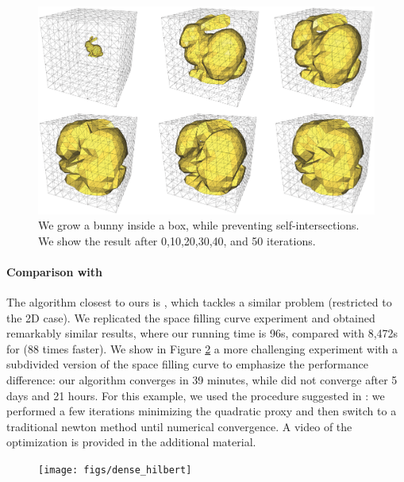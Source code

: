 \begin{figure}[t]
\includegraphics[width=0.8\columnwidth]{figs/rabbit_grow}
\caption{We grow a bunny inside a box, while preventing  self-intersections. We show the result after 0,10,20,30,40, and 50 iterations.}
\label{scaf:fig:rabbit}
\end{figure}


\paragraph{Comparison with \cite{Smith:2015}}
The algorithm closest to ours is \cite{Smith:2015}, which tackles a similar problem (restricted to the 2D case). We replicated the space filling curve experiment and obtained remarkably similar results, where our running time is 96s, compared with 8,472s for \cite{Smith:2015} (88 times faster). We show in Figure \ref{scaf:fig:smith} a more challenging experiment with a subdivided version of the space filling curve to emphasize the performance difference: our algorithm converges in 39 minutes, while \cite{Smith:2015} did not converge after 5 days and 21 hours. For this example, we used the procedure suggested in \cite{Rabinovich:2017}: we performed a few iterations minimizing the quadratic proxy and then switch to a traditional newton method until numerical convergence. A video of the optimization is provided in the additional material.

\begin{figure}[t]
\texttt{[image: figs/dense\_hilbert]}
\caption{}
\label{scaf:fig:smith}
\vspace{-0.2cm}
\end{figure}

